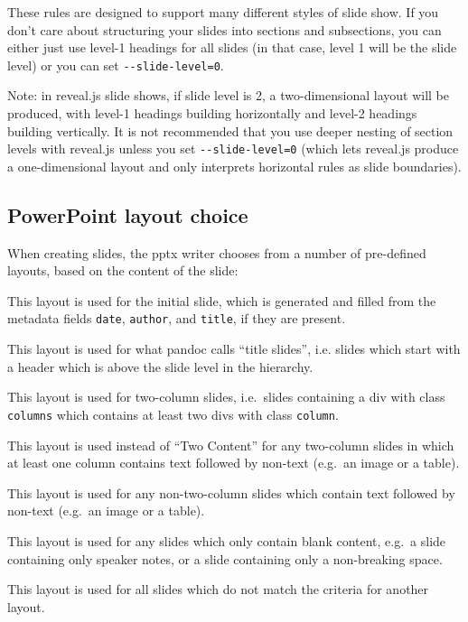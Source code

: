 \documentclass[
  b5paper
]{book}
\providecommand{\tightlist}{%
  \setlength{\itemsep}{0pt}\setlength{\parskip}{0pt}}
\begin{document}
These rules are designed to support many different styles of slide show.
If you don't care about structuring your slides into sections and
subsections, you can either just use level-1 headings for all slides (in
that case, level 1 will be the slide level) or you can set
\texttt{-\/-slide-level=0}.

Note: in reveal.js slide shows, if slide level is 2, a two-dimensional
layout will be produced, with level-1 headings building horizontally and
level-2 headings building vertically. It is not recommended that you use
deeper nesting of section levels with reveal.js unless you set
\texttt{-\/-slide-level=0} (which lets reveal.js produce a
one-dimensional layout and only interprets horizontal rules as slide
boundaries).

\subsection{PowerPoint layout choice}\label{powerpoint-layout-choice}

When creating slides, the pptx writer chooses from a number of
pre-defined layouts, based on the content of the slide:

\begin{description}
\tightlist
\item[Title Slide]
This layout is used for the initial slide, which is generated and filled
from the metadata fields \texttt{date}, \texttt{author}, and
\texttt{title}, if they are present.
\item[Section Header]
This layout is used for what pandoc calls ``title slides'', i.e. slides
which start with a header which is above the slide level in the
hierarchy.
\item[Two Content]
This layout is used for two-column slides, i.e.~slides containing a div
with class \texttt{columns} which contains at least two divs with class
\texttt{column}.
\item[Comparison]
This layout is used instead of ``Two Content'' for any two-column slides
in which at least one column contains text followed by non-text (e.g.~an
image or a table).
\item[Content with Caption]
This layout is used for any non-two-column slides which contain text
followed by non-text (e.g.~an image or a table).
\item[Blank]
This layout is used for any slides which only contain blank content,
e.g.~a slide containing only speaker notes, or a slide containing only a
non-breaking space.
\item[Title and Content]
This layout is used for all slides which do not match the criteria for
another layout.
\end{description}
\end{document}
